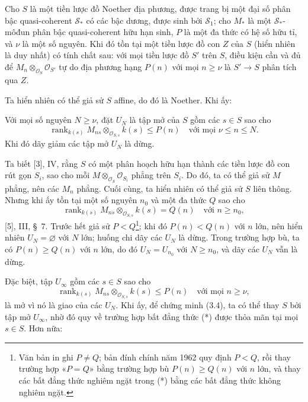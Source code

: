  Cho $S$ là một tiền lược đồ Noether địa phương, được trang
bị một đại số phân bậc quasi-coherent $\mathcal S_*$ có các bậc dương, được
sinh bởi $\mathcal S_1$; cho $M_*$ là một $\mathcal S_*$-môđun phân bậc quasi-coherent
hữu hạn sinh, $P$ là một đa thức có hệ số hữu tỉ, và $\nu$ là một số nguyên.
Khi đó tồn tại một tiền lược đồ con $Z$ của $S$ (hiển nhiên là duy nhất)
có tính chất sau: với mọi tiền lược đồ $S'$ trên $S$, điều kiện cần và đủ để
$M_n\otimes_{\mathcal O_S}\mathcal O_{S'}$ tự do địa phương hạng $P(n)$ với
mọi $n\geq\nu$ là $S'\longrightarrow S$ phân tích qua $Z$.

Ta hiển nhiên có thể giả sử $S$ affine, do đó là Noether. Khi ấy:

 Với mọi số nguyên $N\geq\nu$, đặt $U_N$ là tập mở của $S$
gồm các $s\in S$ sao cho
\[
\operatorname{rank}_{k(s)}
M_{ns}\otimes_{\mathcal O_{S,s}}k(s)\leq P(n)
\quad\text{với mọi $\nu\leq n\leq N$}.
\]
Khi đó dãy giảm các tập mở $U_N$ là dừng.

Ta biết [3], IV, rằng $S$ có một phân hoạch hữu hạn thành các tiền lược đồ con
rút gọn $S_i$, sao cho mỗi $M\otimes_{\mathcal O_S}\mathcal O_{S_i}$ phẳng
trên $S_i$. Do đó, ta có thể giả sử $M$ phẳng, nên các $M_n$ phẳng. Cuối cùng,
ta hiển nhiên có thể giả sử $S$ liên thông. Nhưng khi ấy tồn tại một số nguyên
$n_0$ và một đa thức $Q$ sao cho
\[
\operatorname{rank}_{k(s)}
M_{ns}\otimes_{\mathcal O_{S,s}}k(s)=Q(n)
\quad\text{với $n\geq n_0$},
\]
[5], III, \S~7. Trước hết giả sử $P<Q$\footnote{Văn bản in ghi
$P\neq Q$; bản đính chính năm 1962 quy định $P<Q$, rồi thay trường hợp
«$P=Q$» bằng trường hợp bù $P(n)\geq Q(n)$ với $n$ lớn, và thay các bất đẳng
thức nghiêm ngặt trong (*) bằng các bất đẳng thức không nghiêm ngặt.}; khi đó
$P(n)<Q(n)$ với $n$ lớn, nên hiển nhiên $U_N=\varnothing$ với $N$ lớn; huống
chi dãy các $U_N$ là dừng. Trong trường hợp bù, ta có
$P(n)\geq Q(n)$ với $n$ lớn, do đó $U_N=U_{n_0}$ với $N\geq n_0$, và dãy các
$U_N$ vẫn là dừng.

Đặc biệt, tập $U_\infty$ gồm các $s\in S$ sao cho
\[
\tag{*}
\operatorname{rank}_{k(s)}
M_{ns}\otimes_{\mathcal O_{S,s}}k(s)\leq P(n)
\quad\text{với mọi $n\geq\nu$},
\]
là mở vì nó là giao của các $U_N$. Khi ấy, để chứng minh (3.4), ta có thể thay
$S$ bởi tập mở $U_\infty$, nhờ đó quy về trường hợp bất đẳng thức (*) được
thỏa mãn tại mọi $s\in S$. Hơn nữa:

